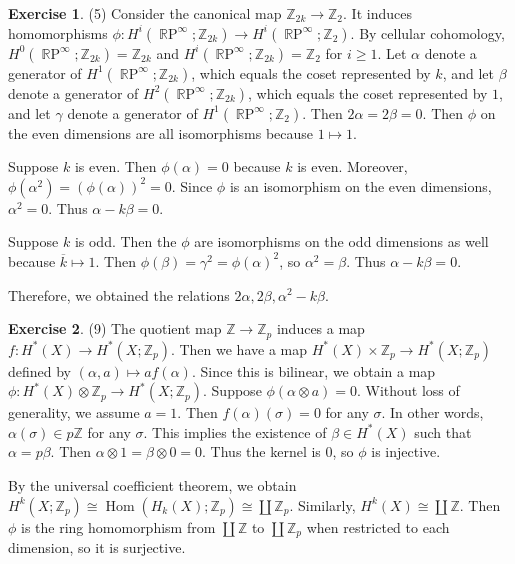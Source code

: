 \documentclass[12pt, psamsfonts]{amsart}
\theoremstyle{definition}
\newtheorem*{exer}{Exercise}
\theoremstyle{remark}
\DeclareMathOperator{\Hom}{Hom}
\DeclareMathOperator{\RP}{\mathbb{R}P}
\numberwithin{equation}{section}
\begin{document}
\begin{exer}{(5)}
  Consider the canonical map $\mathbb{Z}_{2k} \rightarrow \mathbb{Z}_2$.
  It induces homomorphisms $\phi: H^i(\RP^{\infty};\mathbb{Z}_{2k}) \rightarrow H^i(\RP^{\infty};\mathbb{Z}_{2})$.
  By cellular cohomology, $H^0(\RP^{\infty}; \mathbb{Z}_{2k}) = \mathbb{Z}_{2k}$ and $H^i(\RP^{\infty}; \mathbb{Z}_{2k}) = \mathbb{Z}_2$ for $i \geq 1$.
  Let $\alpha$ denote a generator of $H^1(\RP^{\infty};\mathbb{Z}_{2k})$, which equals the coset represented by $k$, and let $\beta$ denote a generator of $H^2(\RP^{\infty}; \mathbb{Z}_{2k})$, which equals the coset represented by $1$, and let $\gamma$ denote a generator of $H^1(\RP^{\infty}; \mathbb{Z}_2)$.
  Then $2\alpha = 2\beta = 0$.
  Then $\phi$ on the even dimensions are all isomorphisms because $1 \mapsto 1$.

  Suppose $k$ is even.
  Then $\phi(\alpha) = 0$ because $k$ is even.
  Moreover, $\phi(\alpha^2) = (\phi(\alpha))^2 = 0$.
  Since $\phi$ is an isomorphism on the even dimensions, $\alpha^2 = 0$.
  Thus $\alpha - k\beta = 0$.

  Suppose $k$ is odd.
  Then the $\phi$ are isomorphisms on the odd dimensions as well because $\overline{k} \mapsto 1$.
  Then $\phi(\beta) = \gamma^2 = \phi(\alpha)^2$, so $\alpha^2 = \beta$.
  Thus $\alpha - k\beta = 0$.

  Therefore, we obtained the relations $2\alpha, 2\beta, \alpha^2 - k\beta$.

\end{exer}

\begin{exer}{(9)}
  The quotient map $\mathbb{Z} \rightarrow \mathbb{Z}_p$ induces a map $f: H^{\ast}(X) \rightarrow H^{\ast}(X; \mathbb{Z}_p)$.
  Then we have a map $H^{\ast}(X) \times \mathbb{Z}_p \rightarrow H^{\ast}(X; \mathbb{Z}_p)$ defined by $(\alpha, a) \mapsto af(\alpha)$.
  Since this is bilinear, we obtain a map $\phi: H^{\ast}(X) \otimes \mathbb{Z}_p \rightarrow H^{\ast}(X; \mathbb{Z}_p)$.
  Suppose $\phi(\alpha \otimes a) = 0$.
  Without loss of generality, we assume $a = 1$.
  Then $f(\alpha)(\sigma) = 0$ for any $\sigma$.
  In other words, $\alpha(\sigma) \in p\mathbb{Z}$ for any $\sigma$.
  This implies the existence of $\beta \in H^{\ast}(X)$ such that $\alpha = p\beta$.
  Then $\alpha \otimes 1 = \beta \otimes 0 = 0$.
  Thus the kernel is 0, so $\phi$ is injective.

  By the universal coefficient theorem, we obtain $H^k(X; \mathbb{Z}_p) \cong \Hom(H_k(X); \mathbb{Z}_p) \cong \coprod \mathbb{Z}_p$.
  Similarly, $H^k(X) \cong \coprod \mathbb{Z}$.
  Then $\phi$ is the ring homomorphism from $\coprod \mathbb{Z}$ to $\coprod \mathbb{Z}_p$ when restricted to each dimension, so it is surjective.
\end{exer}
\end{document}
